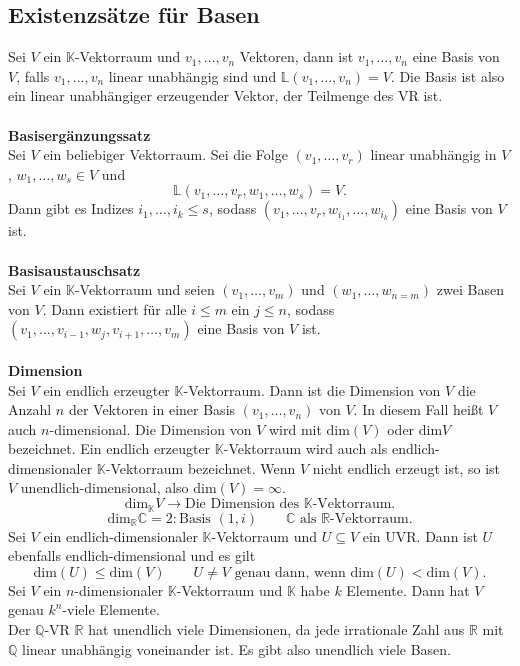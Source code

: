\documentclass[a4paper,12pt]{article}
\numberwithin{equation}{section}
\begin{document}
\subsection{Existenzsätze für Basen}
Sei $V$ ein $\mathbb{K}$-Vektorraum und $v_1,\hdots ,v_n$ Vektoren, dann ist $v_1,\hdots ,v_n$ eine Basis von $V$, falls $v_1,\hdots ,v_n$ linear unabhängig sind und $\mathbb{L}\left(v_1,\hdots ,v_n\right)=V$. Die Basis ist also ein linear unabhängiger erzeugender Vektor, der Teilmenge des VR ist.
\\\hfill\\\textbf{Basisergänzungssatz}\\ 
Sei $V$ ein beliebiger Vektorraum. Sei die Folge $\left(v_1,\hdots ,v_r\right)$ linear unabhängig in $V$, $w_1,\hdots ,w_s \in V$ und
\[ 
        \mathbb{L}\left(v_1,\hdots ,v_r,w_1,\hdots ,w_s\right)=V
.\] 
Dann gibt es Indizes $i_1,\hdots ,i_k\leq s$, sodass $\left(v_1,\hdots ,v_r,w_{i_1},\hdots ,w_{i_k}\right)$ eine Basis von $V$ ist.
\\\hfill\\\textbf{Basisaustauschsatz}\\ 
Sei $V$ ein $\mathbb{K}$-Vektorraum und seien $\left(v_1,\hdots ,v_m\right)$ und $\left(w_1,\hdots ,w_{n=m}\right)$ zwei Basen von $V$. Dann existiert für alle $i\leq m$ ein $j\leq n$, sodass $\left(v_1,\hdots ,v_{i-1},w_j,v_{i+1},\hdots ,v_m\right)$ eine Basis von $V$ ist. 
\\\hfill\\\textbf{Dimension}\\ 
Sei $V$ ein endlich erzeugter $\mathbb{K}$-Vektorraum. Dann ist die Dimension von $V$ die Anzahl $n$ der Vektoren in einer Basis $\left(v_1,\hdots ,v_n\right)$ von $V$. In diesem Fall heißt $V$ auch $n$-dimensional. Die Dimension von $V$ wird mit $\text{dim}\left(V\right)$ oder $\text{dim}V$ bezeichnet. Ein endlich erzeugter $\mathbb{K}$-Vektorraum wird auch als endlich-dimensionaler $\mathbb{K}$-Vektorraum bezeichnet. Wenn $V$ nicht endlich erzeugt ist, so ist $V$ unendlich-dimensional, also $\text{dim}\left(V\right)=\infty$.
\[ 
        \text{dim}_\mathbb{K}V\rightarrow \text{Die Dimension des $\mathbb{K}$-Vektorraum}
.\] 
\[ 
        \text{dim}_\mathbb{R}\mathbb{C}=2:\text{Basis }\left(1,i\right)\qquad \mathbb{C}\text{ als }\mathbb{R}\text{-Vektorraum}
.\] 
Sei $V$ ein endlich-dimensionaler $\mathbb{K}$-Vektorraum und $U\subseteq V$ ein UVR. Dann ist $U$ ebenfalls endlich-dimensional und es gilt
\[ 
        \text{dim}\left(U\right)\leq \text{dim}\left(V\right)\qquad U\neq V\text{ genau dann, wenn }\text{dim}\left(U\right)<\text{dim}\left(V\right)
.\] 
Sei $V$ ein $n$-dimensionaler $\mathbb{K}$-Vektorraum und $\mathbb{K}$ habe $k$ Elemente. Dann hat $V$ genau $k^{n}$-viele Elemente.\\Der $\mathbb{Q}$-VR $\mathbb{R}$ hat unendlich viele Dimensionen, da jede irrationale Zahl aus $\mathbb{R}$ mit $\mathbb{Q}$ linear unabhängig voneinander ist. Es gibt also unendlich viele Basen.
\end{document}

